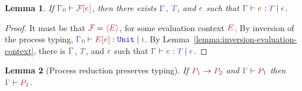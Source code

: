 \documentclass{article}
\newtheorem{lemma}{Lemma}
\begin{document}
\begin{lemma}
  \label{lemma:inversion-process-evaluation-context}
  If $\ProcHasType{\Ctx_0} {\FCapp{\E}}$, then there exists $\Ctx$,
  $\T$, and $\Eff$ such that $\HasType{\Ctx}{\E}{\T}{\Eff}$.
\end{lemma}
\begin{proof}
  It must be that $\FC = \PExp \EC$, for some evaluation context $\EC$.
  By inversion of the process typing,
  $\HasType{\Ctx_0}{\EC[\E]}{\TBUnit}{\EffImpure}$.
  By Lemma~\ref{lemma:inversion-evaluation-context}, there is  $\Ctx$,
  $\T$, and $\Eff$ such that $\HasType{\Ctx}{\E}{\T}{\Eff}$.
\end{proof}

\clearpage
\begin{lemma}[Process reduction preserves typing]
  If $\Proc[1] \Reduces \Proc[2]$ and 
  $\ProcHasType {\Ctx} {\Proc[1]}$
  then 
  $\ProcHasType {\Ctx} {\Proc[2]}$.
\end{lemma}
\end{document}

